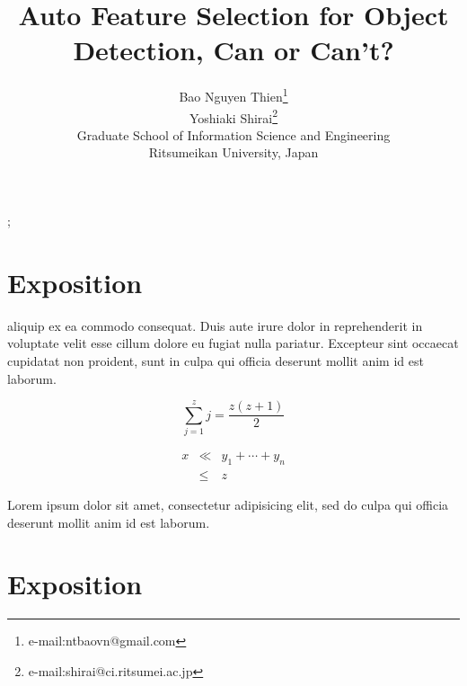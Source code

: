 \documentclass[annual]{acmsiggraph}
\title{Auto Feature Selection for Object Detection, Can or Can't?}
\author{Bao Nguyen Thien\thanks{e-mail:ntbaovn@gmail.com}\\ 
        Yoshiaki Shirai\thanks{e-mail:shirai@ci.ritsumei.ac.jp} \\
        Graduate School of Information Science and Engineering\\
        Ritsumeikan University, Japan
}
\begin{document}

\maketitle



\begin{CRcatlist}
   ;
\end{CRcatlist}

\keywordlist

\TOGlinkslist

\copyrightspace













\section{Exposition}

aliquip ex ea commodo consequat. Duis aute irure dolor in
reprehenderit in voluptate velit esse cillum dolore eu fugiat nulla
pariatur. Excepteur sint occaecat cupidatat non proident, sunt in
culpa qui officia deserunt mollit anim id est laborum.

\begin{equation}
 \sum_{j=1}^{z} j = \frac{z(z+1)}{2}
\end{equation}

\begin{eqnarray}
x & \ll & y_{1} + \cdots + y_{n} \\
  & \leq & z
\end{eqnarray}

Lorem ipsum dolor sit amet, consectetur adipisicing elit, sed do
culpa qui officia deserunt mollit anim id est laborum.

\section{Exposition}
\end{document}

